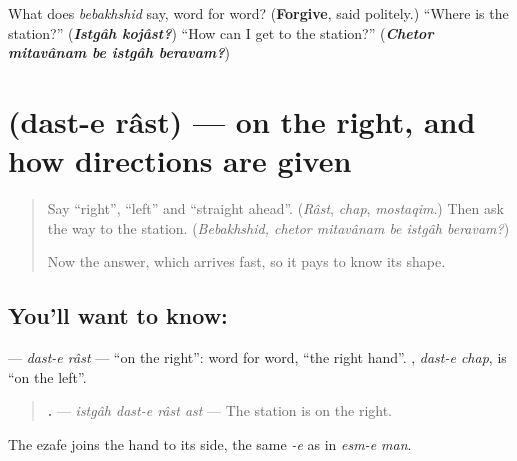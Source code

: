 \begin{tcolorbox}[breakable,colback=teal!4,colframe=teal!35!black,title={Before you move on}]
What does \emph{bebakhshid} say, word for word? (\textbf{Forgive}, said politely.) \textquotedblleft{}Where is the station?\textquotedblright{} (\emph{\textbf{Istgâh kojâst?}}) \textquotedblleft{}How can I get to the station?\textquotedblright{} (\emph{\textbf{Chetor mitavânam be istgâh beravam?}})
\end{tcolorbox}
\section[\texorpdfstring{\fa{دست} \fa{راست} (dast-e râst)}{دست راست (dast-e râst)}]{  (dast-e râst) — on the right, and how directions are given}

\label{lesson:FA-C294-dast-e-rast}



\begin{quote}
Say \textquotedblleft{}right\textquotedblright{}, \textquotedblleft{}left\textquotedblright{} and \textquotedblleft{}straight ahead\textquotedblright{}. (\emph{Râst}, \emph{chap}, \emph{mostaqim}.) Then ask the way to the station. (\emph{Bebakhshid, chetor mitavânam be istgâh beravam?})

Now the answer, which arrives fast, so it pays to know its shape.
\end{quote}

\subsection*{You'll want to know:  }
\textbf{ } — \emph{dast-e râst} — \textquotedblleft{}on the right\textquotedblright{}: word for word, \textquotedblleft{}the right hand\textquotedblright{}. \textbf{ }, \emph{dast-e chap}, is \textquotedblleft{}on the left\textquotedblright{}.

\begin{quote}
\textbf{   .} — \emph{istgâh dast-e râst ast} — The station is on the right.
\end{quote}

The ezafe joins the hand to its side, the same \emph{-e} as in \emph{esm-e man}.


